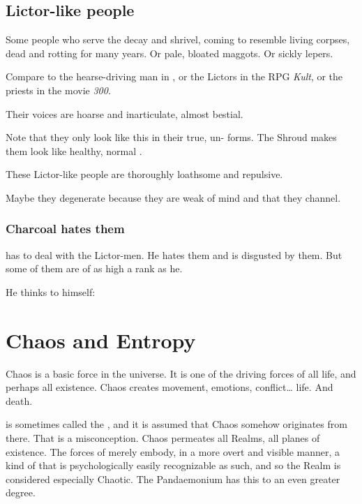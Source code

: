 \subsection{Lictor-like people}
Some people who serve the \banes{} decay and shrivel, coming to resemble living corpses, dead and rotting for many years. Or pale, bloated maggots. Or sickly lepers. 

Compare to the hearse-driving man in , or the Lictors in the RPG \emph{Kult}, or the priests in the movie \emph{300}.

Their voices are hoarse and inarticulate, almost bestial.

Note that they only look like this in their true, un- forms. The Shroud makes them look like healthy, normal \humans.

These Lictor-like people are thoroughly loathsome and repulsive. 

Maybe they degenerate because they are weak of mind and  that they channel.





\subsubsection{Charcoal hates them}
 has to deal with the Lictor-men. He hates them and is disgusted by them. But some of them are of as high a rank as he. 

He thinks to himself: 















\section{Chaos and Entropy}
Chaos is a basic force in the universe. 
It is one of the driving forces of all life, and perhaps all existence. 
Chaos creates movement, emotions, conflict\ldots{} life. 
And death. 

\Machai{} is sometimes called the , and it is assumed that Chaos somehow originates from there. 
That is a misconception. 
Chaos permeates all Realms, all planes of existence. 
The forces of \Machai{} merely embody, in a more overt and visible manner, a kind of  that is psychologically easily recognizable as such, and so the Realm is considered especially Chaotic. 
The Pandaemonium has this to an even greater degree. 

